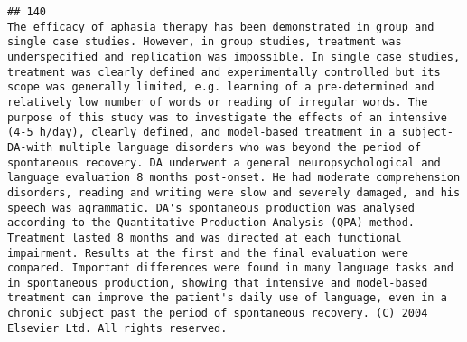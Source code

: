 \documentclass[
  english,
  man]{apa6}
\begin{document}
\begin{verbatim}
## 140                                                                                                                                                                                                                                                                                                                                                                                                                                                                                                                                                                                                                                                                                                                                                                                                                                                                                                                                                                                                                                                                                                                                                                                                                                             The efficacy of aphasia therapy has been demonstrated in group and single case studies. However, in group studies, treatment was underspecified and replication was impossible. In single case studies, treatment was clearly defined and experimentally controlled but its scope was generally limited, e.g. learning of a pre-determined and relatively low number of words or reading of irregular words. The purpose of this study was to investigate the effects of an intensive (4-5 h/day), clearly defined, and model-based treatment in a subject-DA-with multiple language disorders who was beyond the period of spontaneous recovery. DA underwent a general neuropsychological and language evaluation 8 months post-onset. He had moderate comprehension disorders, reading and writing were slow and severely damaged, and his speech was agrammatic. DA's spontaneous production was analysed according to the Quantitative Production Analysis (QPA) method. Treatment lasted 8 months and was directed at each functional impairment. Results at the first and the final evaluation were compared. Important differences were found in many language tasks and in spontaneous production, showing that intensive and model-based treatment can improve the patient's daily use of language, even in a chronic subject past the period of spontaneous recovery. (C) 2004 Elsevier Ltd. All rights reserved.

\end{verbatim}
\end{document}
